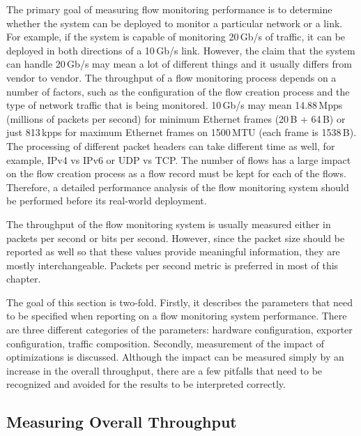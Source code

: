 The primary goal of measuring flow monitoring performance is to determine whether the system can be deployed to monitor a particular network or a link. For example, if the system is capable of monitoring 20\,Gb/s of traffic, it can be deployed in both directions of a 10\,Gb/s link. However, the claim that the system can handle 20\,Gb/s may mean a lot of different things and it usually differs from vendor to vendor. The throughput of a flow monitoring process depends on a number of factors, such as the configuration of the flow creation process and the type of network traffic that is being monitored. 10\,Gb/s may mean 14.88\,Mpps (millions of packets per second) for minimum Ethernet frames (20\,B + 64\,B) or just 813\,kpps for maximum Ethernet frames on 1500\,MTU (each frame is 1538\,B). The processing of different packet headers can take different time as well, for example, IPv4 vs IPv6 or UDP vs TCP. The number of flows has a large impact on the flow creation process as a flow record must be kept for each of the flows. Therefore, a detailed performance analysis of the flow monitoring system should be performed before its real-world deployment.

The throughput of the flow monitoring system is usually measured either in packets per second or bits per second. However, since the packet size should be reported as well so that these values provide meaningful information, they are mostly interchangeable. Packets per second metric is preferred in most of this chapter.

The goal of this section is two-fold. Firstly, it describes the parameters that need to be specified when reporting on a flow monitoring system performance. There are three different categories of the parameters: hardware configuration, exporter configuration, traffic composition. Secondly, measurement of the impact of optimizations is discussed. Although the impact can be measured simply by an increase in the overall throughput, there are a few pitfalls that need to be recognized and avoided for the results to be interpreted correctly.


\subsection{Measuring Overall Throughput}

